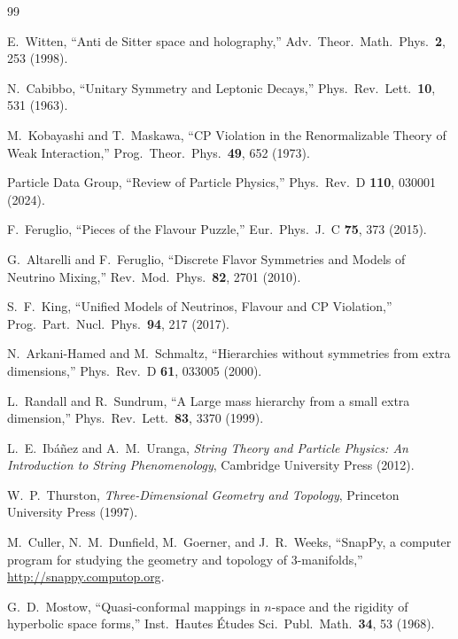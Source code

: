 \documentclass[11pt,a4paper]{article}
\begin{document}
\begin{thebibliography}{99}

E.~Witten,
``Anti de Sitter space and holography,''
Adv.\ Theor.\ Math.\ Phys.\ \textbf{2}, 253 (1998).

N.~Cabibbo,
``Unitary Symmetry and Leptonic Decays,''
Phys.\ Rev.\ Lett.\ \textbf{10}, 531 (1963).

M.~Kobayashi and T.~Maskawa,
``CP Violation in the Renormalizable Theory of Weak Interaction,''
Prog.\ Theor.\ Phys.\ \textbf{49}, 652 (1973).

Particle Data Group,
``Review of Particle Physics,''
Phys.\ Rev.\ D \textbf{110}, 030001 (2024).

F.~Feruglio,
``Pieces of the Flavour Puzzle,''
Eur.\ Phys.\ J.\ C \textbf{75}, 373 (2015).

G.~Altarelli and F.~Feruglio,
``Discrete Flavor Symmetries and Models of Neutrino Mixing,''
Rev.\ Mod.\ Phys.\ \textbf{82}, 2701 (2010).

S.~F.~King,
``Unified Models of Neutrinos, Flavour and CP Violation,''
Prog.\ Part.\ Nucl.\ Phys.\ \textbf{94}, 217 (2017).

N.~Arkani-Hamed and M.~Schmaltz,
``Hierarchies without symmetries from extra dimensions,''
Phys.\ Rev.\ D \textbf{61}, 033005 (2000).

L.~Randall and R.~Sundrum,
``A Large mass hierarchy from a small extra dimension,''
Phys.\ Rev.\ Lett.\ \textbf{83}, 3370 (1999).

L.~E.~Ib\'a\~nez and A.~M.~Uranga,
\emph{String Theory and Particle Physics: An Introduction to String Phenomenology},
Cambridge University Press (2012).

W.~P.~Thurston,
\emph{Three-Dimensional Geometry and Topology},
Princeton University Press (1997).

M.~Culler, N.~M.~Dunfield, M.~Goerner, and J.~R.~Weeks,
``SnapPy, a computer program for studying the geometry and topology 
of 3-manifolds,''
\url{http://snappy.computop.org}.

G.~D.~Mostow,
``Quasi-conformal mappings in $n$-space and the rigidity of hyperbolic 
space forms,''
Inst.\ Hautes \'Etudes Sci.\ Publ.\ Math.\ \textbf{34}, 53 (1968).


\end{thebibliography}
\end{document}
